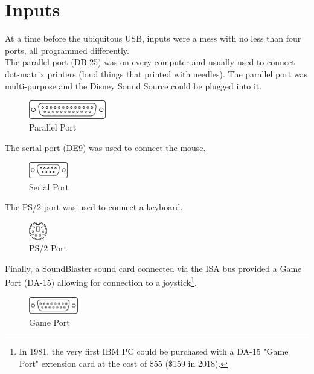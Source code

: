 \documentclass[book.tex]{subfiles}
\begin{document}
\section{Inputs}
At a time before the ubiquitous USB, inputs were a mess with no less than four ports, all programmed differently.\\

The parallel port (DB-25) was on every computer and usually used to connect dot-matrix printers (loud things that printed with needles). The parallel port was multi-purpose and the Disney Sound Source could be plugged into it.\\
\par
 \begin{figure}[H]
\centering
\includegraphics[width=0.3\textwidth]{imgs/drawings/ports/DB-25_parallel_port.eps}
\caption{Parallel Port}
\label{fig:parallelPort}
\end{figure}


The serial port (DE9) was used to connect the mouse.
 \begin{figure}[H]
\centering
\includegraphics[width=0.15\textwidth]{imgs/drawings/ports/DE9_serial_port.eps}
\caption{Serial Port}
\label{fig:serialPort}
\end{figure}

The PS/2 port was used to connect a keyboard.
 \begin{figure}[H]
\centering
\includegraphics[width=0.07\textwidth]{imgs/drawings/ports/MiniDIN-6_PS2.eps}
\caption{PS/2 Port}
\label{fig:ps2Port}
\end{figure}


Finally, a SoundBlaster sound card connected via the ISA bus provided a Game Port (DA-15) allowing for connection to a joystick\footnote{In 1981, the very first IBM PC could be purchased with a DA-15 "Game Port" extension card at the cost of \$55 (\$159 in 2018).}.
 \begin{figure}[H]
\centering
\includegraphics[width=0.19\textwidth]{imgs/drawings/ports/DA-15_GamePort.eps}
\caption{Game Port}
\label{fig:gamePort}
\end{figure}
\end{document}
